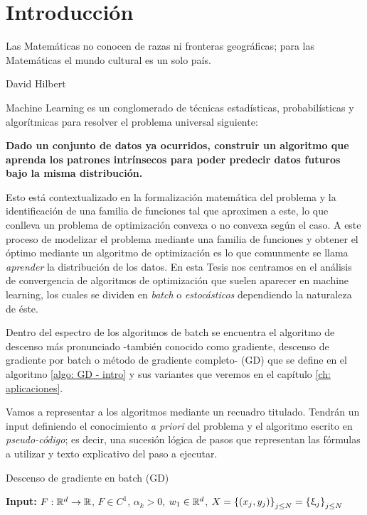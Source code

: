 \chapter{Introducci\'on}\label{ch:introduccion}

\epigraph{Las Matem\'aticas no conocen de razas ni fronteras geogr\'aficas; para las Matem\'aticas el mundo cultural es un solo pa\'is.}{David Hilbert}

Machine Learning es un conglomerado de t\'ecnicas estad\'isticas, probabil\'isticas y algor\'itmicas para resolver el problema universal siguiente:

\begin{center}
\textbf{Dado un conjunto de datos ya ocurridos, construir un algoritmo que aprenda los patrones intr\'insecos para poder predecir datos futuros bajo la misma distribuci\'on.}
\end{center}

Esto est\'a contextualizado en la formalizaci\'on matem\'atica del problema y la identificaci\'on de una familia de funciones tal que aproximen a este, lo que conlleva un problema de optimizaci\'on convexa o no convexa seg\'un el caso. A este proceso de modelizar el problema mediante una familia de funciones y obtener el \'optimo mediante un algoritmo de optimizaci\'on es lo que comunmente se llama \textit{aprender} la distribuci\'on de los datos. En esta Tesis nos centramos en el an\'alisis de convergencia de algoritmos de optimizaci\'on que suelen aparecer en machine learning, los cuales se dividen en \textit{batch} o \textit{estoc\'asticos} dependiendo la naturaleza de \'este.

Dentro del espectro de los algoritmos de batch se encuentra el algoritmo de descenso m\'as pronunciado -tambi\'en conocido como gradiente, descenso de gradiente por batch o m\'etodo de gradiente completo- (GD) que se define en el algoritmo \ref{algo: GD - intro} y sus variantes que veremos en el cap\'itulo \ref{ch: aplicaciones}.

Vamos a representar a los algoritmos mediante un recuadro titulado. Tendr\'an un input definiendo el conocimiento \textit{a priori} del problema y el algoritmo escrito en \textit{pseudo-c\'odigo}; es decir, una sucesi\'on l\'ogica de pasos que representan las f\'ormulas a utilizar y texto explicativo del paso a ejecutar.

\LinesNumbered
\begin{algorithm}[H]
	\caption{Descenso de gradiente en batch (GD) \label{algo: GD - intro}}
	\textbf{Input:} $F: {\mathbb{R}}^d \rightarrow {\mathbb{R}}$, $F \in C^1$, $\alpha_k >0$, $w_1 \in {\mathbb{R}}^d$, $X = \left\lbrace(x_j,y_j)\right\rbrace_{j \leq N} = \left\lbrace\upxi_j\right\rbrace_{j \leq N}$  \\
\end{algorithm}

